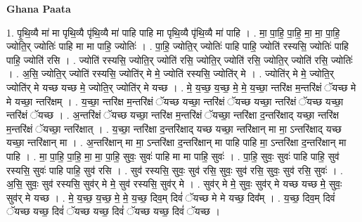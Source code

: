 \documentclass[17pt]{extarticle}
\begin{document}
\textbf{Ghana Paata } \newline

1. पृ॒थि॒व्यै मा॑ मा पृथि॒व्यै पृ॑थि॒व्यै मा॑ पाहि पाहि मा पृथि॒व्यै पृ॑थि॒व्यै मा॑ पाहि । . मा॒ पा॒हि॒ पा॒हि॒ मा॒ मा॒ पा॒हि॒ ज्योति॒र् ज्योतिः॑ पाहि मा मा पाहि॒ ज्योतिः॑ । . पा॒हि॒ ज्योति॒र् ज्योतिः॑ पाहि पाहि॒ ज्योति॑ रस्यसि॒ ज्योतिः॑ पाहि पाहि॒ ज्योति॑ रसि । . ज्योति॑ रस्यसि॒ ज्योति॒र् ज्योति॑ रसि॒ ज्योति॒र् ज्योति॑ रसि॒ ज्योति॒र् ज्योति॑ रसि॒ ज्योतिः॑ । . अ॒सि॒ ज्योति॒र् ज्योति॑ रस्यसि॒ ज्योति॑र् मे मे॒ ज्योति॑ रस्यसि॒ ज्योति॑र् मे । . ज्योति॑र् मे मे॒ ज्योति॒र् ज्योति॑र् मे यच्छ यच्छ मे॒ ज्योति॒र् ज्योति॑र् मे यच्छ । . मे॒ य॒च्छ॒ य॒च्छ॒ मे॒ मे॒ य॒च्छा॒ न्तरि॑क्ष म॒न्तरि॑क्षं ॅयच्छ मे मे यच्छा॒ न्तरि॑क्षम् । . य॒च्छा॒ न्तरि॑क्ष म॒न्तरि॑क्षं ॅयच्छ यच्छा॒ न्तरि॑क्षं ॅयच्छ यच्छा॒ न्तरि॑क्षं ॅयच्छ यच्छा॒ न्तरि॑क्षं ॅयच्छ । . अ॒न्तरि॑क्षं ॅयच्छ यच्छा॒ न्तरि॑क्ष म॒न्तरि॑क्षं ॅयच्छा॒ न्तरि॑क्षा द॒न्तरि॑क्षाद् यच्छा॒ न्तरि॑क्ष म॒न्तरि॑क्षं ॅयच्छा॒ न्तरि॑क्षात् । . य॒च्छा॒ न्तरि॑क्षा द॒न्तरि॑क्षाद् यच्छ यच्छा॒ न्तरि॑क्षान् मा मा॒ ऽन्तरि॑क्षाद् यच्छ यच्छा॒ न्तरि॑क्षान् मा । . अ॒न्तरि॑क्षान् मा मा॒ ऽन्तरि॑क्षा द॒न्तरि॑क्षान् मा पाहि पाहि मा॒ ऽन्तरि॑क्षा द॒न्तरि॑क्षान् मा पाहि । . मा॒ पा॒हि॒ पा॒हि॒ मा॒ मा॒ पा॒हि॒ सुवः॒ सुवः॑ पाहि मा मा पाहि॒ सुवः॑ । . पा॒हि॒ सुवः॒ सुवः॑ पाहि पाहि॒ सुव॑ रस्यसि॒ सुवः॑ पाहि पाहि॒ सुव॑ रसि । . सुव॑ रस्यसि॒ सुवः॒ सुव॑ रसि॒ सुवः॒ सुव॑ रसि॒ सुवः॒ सुव॑ रसि॒ सुवः॑ । . अ॒सि॒ सुवः॒ सुव॑ रस्यसि॒ सुव॑र् मे मे॒ सुव॑ रस्यसि॒ सुव॑र् मे । . सुव॑र् मे मे॒ सुवः॒ सुव॑र् मे यच्छ यच्छ मे॒ सुवः॒ सुव॑र् मे यच्छ । . मे॒ य॒च्छ॒ य॒च्छ॒ मे॒ मे॒ य॒च्छ॒ दिव॒म् दिवं॑ ॅयच्छ मे मे यच्छ॒ दिव᳚म् । . य॒च्छ॒ दिव॒म् दिवं॑ ॅयच्छ यच्छ॒ दिवं॑ ॅयच्छ यच्छ॒ दिवं॑ ॅयच्छ यच्छ॒ दिवं॑ ॅयच्छ । \newline
\end{document}
